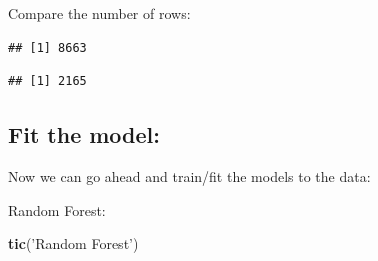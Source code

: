 \documentclass[
]{book}
\newenvironment{Shaded}{\begin{snugshade}}{\end{snugshade}}
\newcommand{\CommentTok}[1]{\textcolor[rgb]{0.56,0.35,0.01}{\textit{#1}}}
\newcommand{\DataTypeTok}[1]{\textcolor[rgb]{0.13,0.29,0.53}{#1}}
\newcommand{\KeywordTok}[1]{\textcolor[rgb]{0.13,0.29,0.53}{\textbf{#1}}}
\newcommand{\NormalTok}[1]{#1}
\newcommand{\OperatorTok}[1]{\textcolor[rgb]{0.81,0.36,0.00}{\textbf{#1}}}
\newcommand{\StringTok}[1]{\textcolor[rgb]{0.31,0.60,0.02}{#1}}
\begin{document}
Compare the number of rows:

\begin{Shaded}
\end{Shaded}

\begin{verbatim}
## [1] 8663
\end{verbatim}

\begin{Shaded}
\end{Shaded}

\begin{verbatim}
## [1] 2165
\end{verbatim}

\hypertarget{fit-the-model}{%
\subsection{Fit the model:}\label{fit-the-model}}

Now we can go ahead and train/fit the models to the data:

\begin{Shaded}
\end{Shaded}

Random Forest:

\begin{Shaded}
\begin{Highlighting}[]
\KeywordTok{tic}\NormalTok{(}\StringTok{'Random Forest'}\NormalTok{)}
\end{Highlighting}
\end{Shaded}

\begin{Shaded}
\end{Shaded}
\end{document}
